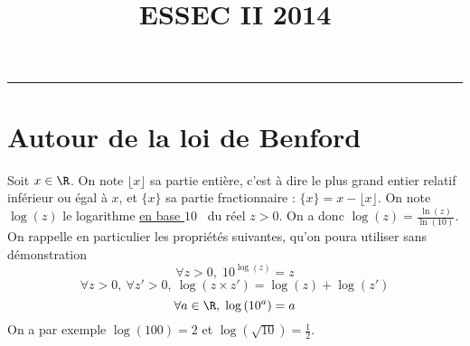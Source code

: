 \documentclass[11pt]{article}%
\title{\bf \vspace{-1cm} ESSEC II 2014} %
\author{} %
\date{} %
\begin{document}
\maketitle %
\vspace{-1.2cm}\hrule %
\thispagestyle{fancy}

\vspace*{.4cm}


\section{Autour de la loi de Benford}
\noindent
Soit $x\in\R$. On note $\lfloor x\rfloor$ sa partie entière, c'est à 
dire le plus grand entier relatif inférieur ou égal à $x$, et $\{ 
x\}$ sa partie fractionnaire : $\{ x\}=x-\lfloor x\rfloor$. On note 
$\log (z)$ le logarithme \underline{en base $10$} \ du réel $z>0$. On a 
donc $\log (z)=\frac{\ln (z)}{\ln (10)}$. On rappelle en particulier 
les propriétés suivantes, qu'on poura utiliser sans démonstration 
\[
\forall z>0, \; 10^{\log (z)}=z
\]
\[
\forall z>0, \ \forall z'>0, \ \log(z \times z')=\log (z)+\log (z')
\]
\[
\forall a\in\R, \; \log\left(10^a\right)=a
\]
On a par exemple $\log (100)=2$ et $\log(\sqrt{10})=\frac 12$.
\end{document}
